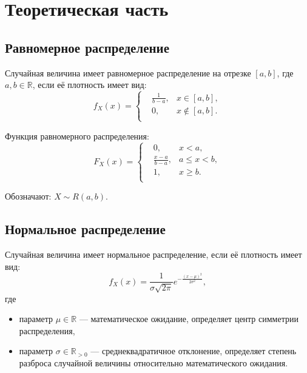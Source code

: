 \documentclass[a4paper,oneside,12pt]{extreport}
\begin{document}


\tableofcontents

\chapter{Теоретическая часть}

\section{Равномерное распределение}

Случайная величина имеет равномерное распределение на отрезке $[a, b]$, где $a, b \in \mathbb R$, если её плотность имеет вид:
\begin{equation}
	f_X(x) =
	\left\{
	\begin{aligned}
		& \frac{1}{b - a}, & x \in [a, b], \\
		& 0,               & x \notin [a, b]. \\
	\end{aligned}
	\right.
\end{equation}

Функция равномерного распределения:
\begin{equation}
	F_X(x) =
	\left\{
	\begin{aligned}
		& 0,                   & x < a, \\
		& \frac{x - a}{b - a}, & a \leqslant x < b, \\
		& 1,                   & x \geqslant b. \\
	\end{aligned}
	\right.
\end{equation}

Обозначают: $X \sim R(a, b)$.

\section{Нормальное распределение}

Случайная величина имеет нормальное распределение, если её плотность имеет вид:
\begin{equation}
	f_X(x) = \frac{1}{\sigma\sqrt{2\pi}}e^{-\frac{(x - \mu)^2}{2\sigma^2}},
\end{equation}
где
\begin{itemize}
	\item параметр $\mu \in \mathbb R$ — математическое ожидание, определяет центр симметрии распределения,
	\item параметр $\sigma \in \mathbb R_{> 0}$ — среднеквадратичное отклонение, определяет степень разброса случайной величины относительно математического ожидания.
\end{itemize}
\end{document}
